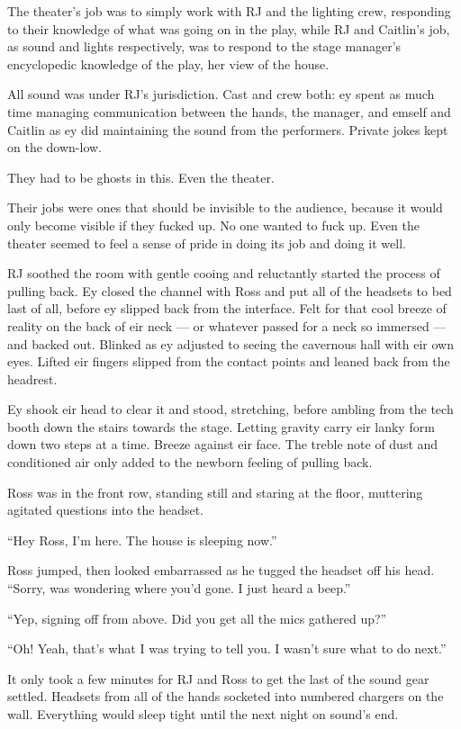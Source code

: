 The theater's job was to simply work with RJ and the lighting crew, responding to their knowledge of what was going on in the play, while RJ and Caitlin's job, as sound and lights respectively, was to respond to the stage manager's encyclopedic knowledge of the play, her view of the house.

All sound was under RJ's jurisdiction. Cast and crew both: ey spent as much time managing communication between the hands, the manager, and emself and Caitlin as ey did maintaining the sound from the performers. Private jokes kept on the down-low.

They had to be ghosts in this. Even the theater.

Their jobs were ones that should be invisible to the audience, because it would only become visible if they fucked up. No one wanted to fuck up. Even the theater seemed to feel a sense of pride in doing its job and doing it well.

RJ soothed the room with gentle cooing and reluctantly started the process of pulling back. Ey closed the channel with Ross and put all of the headsets to bed last of all, before ey slipped back from the interface. Felt for that cool breeze of reality on the back of eir neck — or whatever passed for a neck so immersed — and backed out. Blinked as ey adjusted to seeing the cavernous hall with eir own eyes. Lifted eir fingers slipped from the contact points and leaned back from the headrest.

Ey shook eir head to clear it and stood, stretching, before ambling from the tech booth down the stairs towards the stage. Letting gravity carry eir lanky form down two steps at a time. Breeze against eir face. The treble note of dust and conditioned air only added to the newborn feeling of pulling back.

Ross was in the front row, standing still and staring at the floor, muttering agitated questions into the headset.

``Hey Ross, I'm here. The house is sleeping now.''

Ross jumped, then looked embarrassed as he tugged the headset off his head. ``Sorry, was wondering where you'd gone. I just heard a beep.''

``Yep, signing off from above. Did you get all the mics gathered up?''

``Oh! Yeah, that's what I was trying to tell you. I wasn't sure what to do next.''

It only took a few minutes for RJ and Ross to get the last of the sound gear settled. Headsets from all of the hands socketed into numbered chargers on the wall. Everything would sleep tight until the next night on sound's end.

